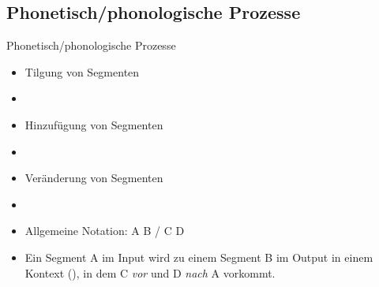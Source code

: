 \subsection{Phonetisch/phonologische Prozesse}

\begin{frame}{Phonetisch/phonologische Prozesse}

\begin{itemize}
	\item Tilgung von Segmenten
	\item[]
	\item Hinzufügung von Segmenten
	\item[]
	\item Veränderung von Segmenten
	\item[]
	\item Allgemeine Notation: A \ras B / C \underline{\quad} D
	\item[] Ein Segment A im Input wird zu einem Segment B im Output in einem Kontext (\gqq{/}), in dem C \textit{vor} und D \textit{nach} A vorkommt. 
\end{itemize}

\end{frame}



